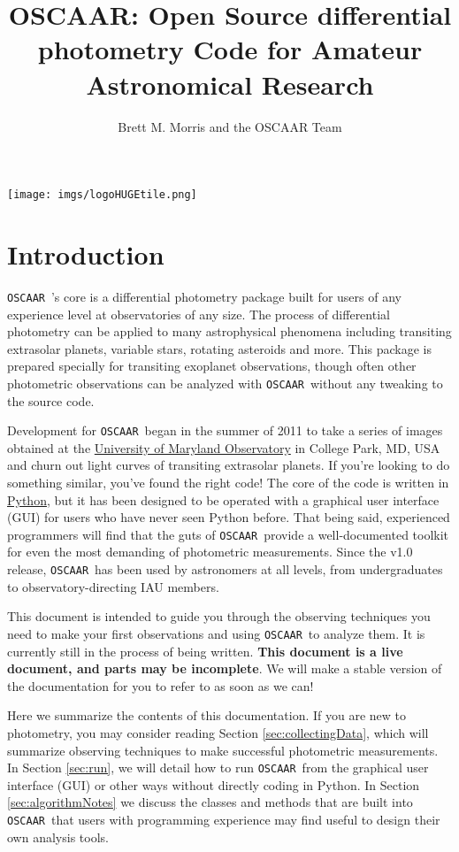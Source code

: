 \documentclass[a4paper]{article}
\newcommand{\code}[1]{\texttt{#1}}
\newcommand{\oscaar}{\code{OSCAAR}~}
\begin{document}
\title{\textbf{OSCAAR}: Open Source differential photometry Code for Amateur Astronomical Research}
\author{Brett M. Morris and the OSCAAR Team}
\maketitle
\begin{center}
\texttt{[image: imgs/logoHUGEtile.png]}
\end{center}
\pagebreak
\tableofcontents
\pagebreak
\section{Introduction}

\oscaar's core is a differential photometry package built for users of any experience level at observatories of any size. The process of differential photometry can be applied to many astrophysical phenomena including transiting extrasolar planets, variable stars, rotating asteroids and more. This package is prepared specially for transiting exoplanet observations, though often other photometric observations can be analyzed with \oscaar without any tweaking to the source code.

Development for \oscaar began in the summer of 2011 to take a series of images obtained at the \href{http://www.astro.umd.edu/openhouse/}{University of Maryland Observatory} in College Park, MD, USA and churn out light curves of transiting extrasolar planets. If you're looking to do something similar, you've found the right code! The core of the code is written in \href{http://www.python.org/}{Python}, but it has been designed to be operated with a graphical user interface (GUI) for users who have never seen Python before. That being said, experienced programmers will find that the guts of \oscaar provide a well-documented toolkit for even the most demanding of photometric measurements. Since the v1.0 release, \oscaar has been used by astronomers at all levels, from undergraduates to observatory-directing IAU members.

This document is intended to guide you through the observing techniques you need to make your first observations and using \oscaar to analyze them. It is currently still in the process of being written. {\bf This document is a live document, and parts may be incomplete}. We will make a stable version of the documentation for you to refer to as soon as we can!

Here we summarize the contents of this documentation. If you are new to photometry, you may consider reading Section \ref{sec:collectingData}, which will summarize observing techniques to make successful photometric measurements. In Section \ref{sec:run}, we will detail how to run \oscaar from the graphical user interface (GUI) or other ways without directly coding in Python. In Section \ref{sec:algorithmNotes} we discuss the classes and methods that are built into \oscaar that users with programming experience may find useful to design their own analysis tools. 
\end{document}

